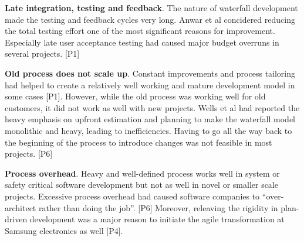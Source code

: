 {\bfseries Late integration, testing and feedback}. The nature of
waterfall development made the testing and feedback cycles very long.
Anwar et al concidered reducing the total testing effort one of the most
significant reasons for improvement. Especially late user acceptance
testing had caused major budget overruns in several projects. [P1]

{\bfseries Old process does not scale up}. Constant improvements and
process tailoring had helped to create a relatively well working and
mature development model in some cases [P1]. However, while the old
process was working well for old customers, it did not work as well with
new projects. Wells et al had reported the heavy emphasis on upfront
estimation and planning to make the waterfall model monolithic and
heavy, leading to inefficiencies. Having to go all the way back to the
beginning of the process to introduce changes was not feasible in most
projects. [P6]

{\bfseries Process overhead}. Heavy and well-defined process works well
in system or safety critical software development but not as well in
novel or smaller scale projects. Excessive process overhead had caused software
companies to ``over-architect rather than doing the job''. [P6] Moreover,
releaving the rigidity in plan-driven development was a major reason to initiate
the agile transformation at Samsung electronics as well [P4].
